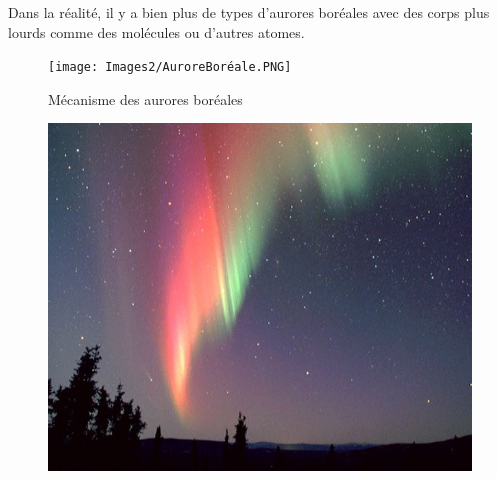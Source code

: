 Dans la réalité, il y a bien plus de types d'aurores boréales avec des corps plus lourds comme des molécules ou d'autres atomes.\\

\begin{figure}[htp]
    \centering
    \texttt{[image: Images2/AuroreBoréale.PNG]}
    \caption{Mécanisme des aurores boréales}
    \label{fig:meca_aurores_boreales}
\end{figure}
\begin{figure}[htp]
    \centering
    \includegraphics[scale=0.6]{Images2/photoAurore.jpg}
\end{figure}